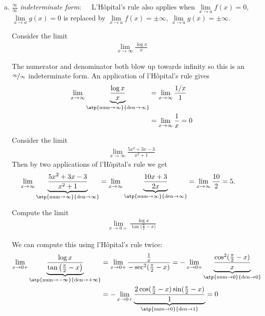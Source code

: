\begin{enumerate}[(a)]
\item $\frac{\infty}{\infty}$ \emph{indeterminate form}:\ \ \
L'H\^opital's rule also applies when
$\lim\limits_{x\rightarrow a}f(x)=0$, $\lim\limits_{x\rightarrow a}g(x)=0$
is replaced by $\lim\limits_{x\rightarrow a}f(x)=\pm\infty$,
$\lim\limits_{x\rightarrow a}g(x)=\pm\infty$.

\begin{eg}\label{eg_3_7_2}
 Consider the limit
\begin{align*}
  \lim_{x \to \infty} \frac{\log x}{x}
\end{align*}

  The numerator and denominator both blow up towards infinity so this is an
$\nicefrac\infty\infty$ indeterminate form. An application of l'H\^opital's rule gives
\begin{align*}
  \lim_{x \to \infty}
  \underbrace{\frac{\log x}{x}}_{\atp
  {\mathrm{num}\rightarrow \infty}{\mathrm{den}\rightarrow \infty}}
 &= \lim_{x \to \infty} \frac{1/x}{1} \\
 &= \lim_{x \to \infty} \frac{1}{x} = 0
\end{align*}
\end{eg}

\begin{eg}\label{eg_3_7_3}
 Consider the limit
\begin{align*}
  \lim_{x \to \infty} \frac{5x^2+3x-3}{x^2+1}
\end{align*}
  Then by two applications of l'H\^opital's rule we get
\begin{align*}
  \lim_{x \to \infty}
  \underbrace{\frac{5x^2+3x-3}{x^2+1}}_{\atp
  {\mathrm{num}\rightarrow \infty}{\mathrm{den}\rightarrow \infty}}
 &= \lim_{x \to \infty}
  \underbrace{\frac{10x+3}{2x}}_{\atp
  {\mathrm{num}\rightarrow \infty}{\mathrm{den}\rightarrow \infty}}
 = \lim_{x \to \infty} \frac{10}{2}
  = 5.
\end{align*}
\end{eg}


\begin{eg}\label{eg:hopitalI}
Compute the limit
\begin{align*}
\lim_{x\rightarrow 0+} \frac{\log x}{\tan\big(\frac{\pi}{2}-x\big)}
\end{align*}

We can compute this using l'H\^opital's rule twice:
\begin{align*}
\lim_{x\rightarrow 0+}\underbrace{\frac{\log x}
      {\tan\big(\frac{\pi}{2}-x\big)}}_{\atp
        {\mathrm{num}\rightarrow -\infty}
        {\mathrm{den}\rightarrow +\infty}}
& =\lim_{x\rightarrow 0+}\frac{\frac{1}{x}}
                          {-\sec^2(\frac{\pi}{2}-x)}
=-\lim_{x\rightarrow 0+}\underbrace{\frac{\cos^2(\frac{\pi}{2}-x)}{x}}_{\atp
        {\mathrm{num}\rightarrow 0}
        {\mathrm{den}\rightarrow 0}} \\
&=-\lim_{x\rightarrow 0+}\underbrace{\frac
          {2\cos(\frac{\pi}{2}-x)\sin(\frac{\pi}{2}-x)}{1}}_{\atp
        {\mathrm{num}\rightarrow 0}
        {\mathrm{den}\rightarrow 1}}
=0
\end{align*}


\end{eg}
\end{enumerate}
